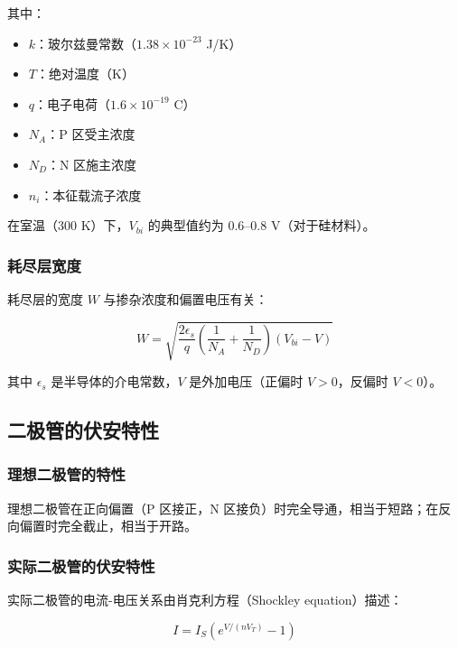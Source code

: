 其中：
\begin{itemize}
  \item $k$：玻尔兹曼常数（$1.38 \times 10^{-23}$ J/K）
  \item $T$：绝对温度（K）
  \item $q$：电子电荷（$1.6 \times 10^{-19}$ C）
  \item $N_A$：P 区受主浓度
  \item $N_D$：N 区施主浓度
  \item $n_i$：本征载流子浓度
\end{itemize}

在室温（300 K）下，$V_{bi}$ 的典型值约为 0.6--0.8 V（对于硅材料）。

\subsubsection{耗尽层宽度}

耗尽层的宽度 $W$ 与掺杂浓度和偏置电压有关：

\begin{equation}
W = \sqrt{\frac{2\epsilon_s}{q}\left(\frac{1}{N_A} + \frac{1}{N_D}\right)(V_{bi} - V)} \label{eq:depletion-width}
\end{equation}

其中 $\epsilon_s$ 是半导体的介电常数，$V$ 是外加电压（正偏时 $V > 0$，反偏时 $V < 0$）。

\subsection{二极管的伏安特性}

\subsubsection{理想二极管的特性}

理想二极管在正向偏置（P 区接正，N 区接负）时完全导通，相当于短路；在反向偏置时完全截止，相当于开路。

\subsubsection{实际二极管的伏安特性}

实际二极管的电流-电压关系由肖克利方程（Shockley equation）描述：

\begin{equation}
I = I_S \left(e^{V/(nV_T)} - 1\right) \label{eq:diode-current}
\end{equation}

